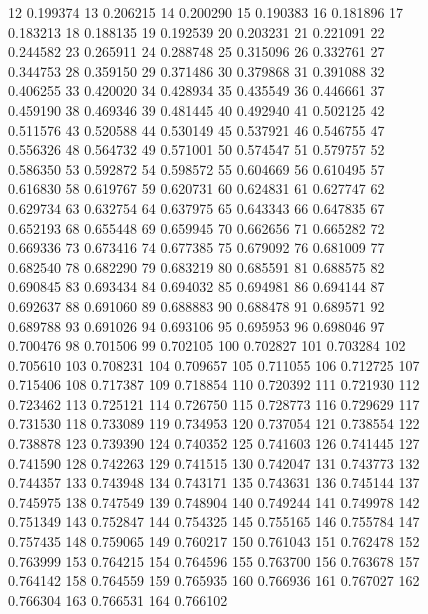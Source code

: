 \begin{figure}
{     12 0.199374
     13 0.206215
     14 0.200290
     15 0.190383
     16 0.181896
     17 0.183213
     18 0.188135
     19 0.192539
     20 0.203231
     21 0.221091
     22 0.244582
     23 0.265911
     24 0.288748
     25 0.315096
     26 0.332761
     27 0.344753
     28 0.359150
     29 0.371486
     30 0.379868
     31 0.391088
     32 0.406255
     33 0.420020
     34 0.428934
     35 0.435549
     36 0.446661
     37 0.459190
     38 0.469346
     39 0.481445
     40 0.492940
     41 0.502125
     42 0.511576
     43 0.520588
     44 0.530149
     45 0.537921
     46 0.546755
     47 0.556326
     48 0.564732
     49 0.571001
     50 0.574547
     51 0.579757
     52 0.586350
     53 0.592872
     54 0.598572
     55 0.604669
     56 0.610495
     57 0.616830
     58 0.619767
     59 0.620731
     60 0.624831
     61 0.627747
     62 0.629734
     63 0.632754
     64 0.637975
     65 0.643343
     66 0.647835
     67 0.652193
     68 0.655448
     69 0.659945
     70 0.662656
     71 0.665282
     72 0.669336
     73 0.673416
     74 0.677385
     75 0.679092
     76 0.681009
     77 0.682540
     78 0.682290
     79 0.683219
     80 0.685591
     81 0.688575
     82 0.690845
     83 0.693434
     84 0.694032
     85 0.694981
     86 0.694144
     87 0.692637
     88 0.691060
     89 0.688883
     90 0.688478
     91 0.689571
     92 0.689788
     93 0.691026
     94 0.693106
     95 0.695953
     96 0.698046
     97 0.700476
     98 0.701506
     99 0.702105
    100 0.702827
    101 0.703284
    102 0.705610
    103 0.708231
    104 0.709657
    105 0.711055
    106 0.712725
    107 0.715406
    108 0.717387
    109 0.718854
    110 0.720392
    111 0.721930
    112 0.723462
    113 0.725121
    114 0.726750
    115 0.728773
    116 0.729629
    117 0.731530
    118 0.733089
    119 0.734953
    120 0.737054
    121 0.738554
    122 0.738878
    123 0.739390
    124 0.740352
    125 0.741603
    126 0.741445
    127 0.741590
    128 0.742263
    129 0.741515
    130 0.742047
    131 0.743773
    132 0.744357
    133 0.743948
    134 0.743171
    135 0.743631
    136 0.745144
    137 0.745975
    138 0.747549
    139 0.748904
    140 0.749244
    141 0.749978
    142 0.751349
    143 0.752847
    144 0.754325
    145 0.755165
    146 0.755784
    147 0.757435
    148 0.759065
    149 0.760217
    150 0.761043
    151 0.762478
    152 0.763999
    153 0.764215
    154 0.764596
    155 0.763700
    156 0.763678
    157 0.764142
    158 0.764559
    159 0.765935
    160 0.766936
    161 0.767027
    162 0.766304
    163 0.766531
    164 0.766102
}
\end{figure}
